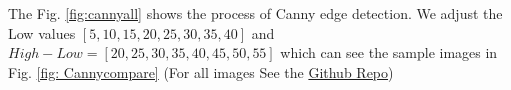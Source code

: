 \documentclass[final]{cvpr}
\begin{document}
\begin{appendices}
The Fig. \ref{fig:cannyall} shows the process of Canny edge detection. We adjust the Low values $[5,10,15,20,25,30,35,40]$ and $High-Low=[20,25,30,35,40,45,50,55]$ which can see the sample images in Fig. \ref{fig: Cannycompare} (For all images See the \href{https://github.com/Arctic-Xiangjian/assignment2/tree/main/findbestcanny}{Github Repo})
\begin{figure}[h]
  \centering
  \quad
  \quad
  \quad
  \quad
  \quad
\end{figure}
\end{appendices}
\end{document}
